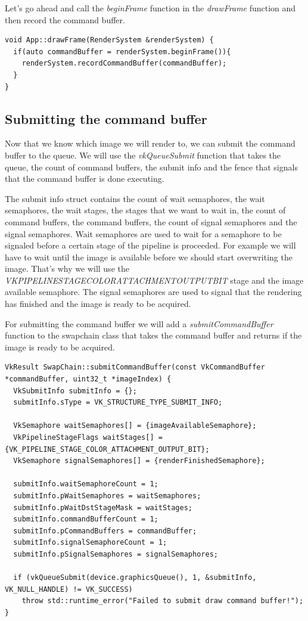 \documentclass[12pt]{report} \usepackage{preamble}
\begin{document}
Let's go ahead and call the \textit{beginFrame} function in the \textit{drawFrame} function and then record the command buffer.

\begin{lstlisting}[Language=C++]
void App::drawFrame(RenderSystem &renderSystem) {
  if(auto commandBuffer = renderSystem.beginFrame()){
    renderSystem.recordCommandBuffer(commandBuffer); 
  }
}
\end{lstlisting}

\subsection{Submitting the command buffer}

Now that we know which image we will render to, we can submit the command buffer to the queue. We will use the \textit{vkQueueSubmit}
function that takes the queue, the count of command buffers, the submit info and the fence that signals that the command buffer is done executing.

The submit info struct contains the count of wait semaphores, the wait semaphores, the wait stages, the stages that we want to wait in,
the count of command buffers, the command buffers, the count of signal semaphores and the signal semaphores. Wait semaphores are used to wait for
a semaphore to be signaled before a certain stage of the pipeline is proceeded. For example we will have to wait until the image is available
before we should start overwriting the image. That's why we will use the
\textit{VK\textunderscore PIPELINE\textunderscore STAGE\textunderscore COLOR\textunderscore ATTACHMENT\textunderscore OUTPUT\textunderscore BIT}
stage and the image available semaphore. The signal semaphores are used to signal that the rendering has finished and the image is ready to be
acquired.

For submitting the command buffer we will add a \textit{submitCommandBuffer} function to the swapchain class that takes the command buffer and returns
if the image is ready to be acquired.

\begin{lstlisting}[Language=C++]
VkResult SwapChain::submitCommandBuffer(const VkCommandBuffer *commandBuffer, uint32_t *imageIndex) {
  VkSubmitInfo submitInfo = {};
  submitInfo.sType = VK_STRUCTURE_TYPE_SUBMIT_INFO;

  VkSemaphore waitSemaphores[] = {imageAvailableSemaphore};
  VkPipelineStageFlags waitStages[] = {VK_PIPELINE_STAGE_COLOR_ATTACHMENT_OUTPUT_BIT};
  VkSemaphore signalSemaphores[] = {renderFinishedSemaphore};

  submitInfo.waitSemaphoreCount = 1;
  submitInfo.pWaitSemaphores = waitSemaphores;
  submitInfo.pWaitDstStageMask = waitStages;
  submitInfo.commandBufferCount = 1;
  submitInfo.pCommandBuffers = commandBuffer;
  submitInfo.signalSemaphoreCount = 1;
  submitInfo.pSignalSemaphores = signalSemaphores;

  if (vkQueueSubmit(device.graphicsQueue(), 1, &submitInfo, VK_NULL_HANDLE) != VK_SUCCESS)
    throw std::runtime_error("Failed to submit draw command buffer!");
}
\end{lstlisting}
\end{document}
